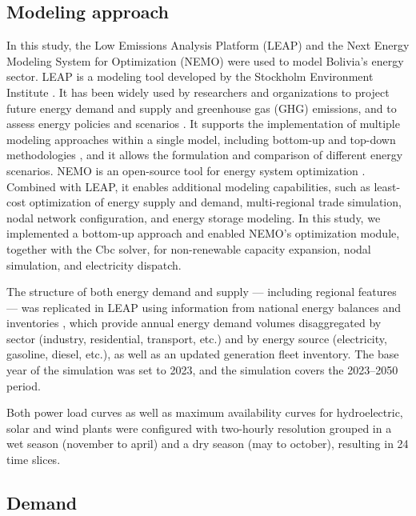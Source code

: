 \documentclass[a4paper,fleqn]{cas-dc}
\begin{document}
\subsection{Modeling approach}

In this study, the Low Emissions Analysis Platform (LEAP) and the Next Energy Modeling System for Optimization (NEMO) were used to model Bolivia's energy sector. LEAP is a modeling tool developed by the Stockholm Environment Institute \cite{Heaps2022LEAP}. It has been widely used by researchers and organizations to project future energy demand and supply and greenhouse gas (GHG) emissions, and to assess energy policies and scenarios \cite{emodi2017energy, shahid2021leap, handayani2023integrating}. It supports the implementation of multiple modeling approaches within a single model, including bottom-up \cite{fleiter2011barriers} and top-down methodologies \cite{rogan2014leaps}, and it allows the formulation and comparison of different energy scenarios. NEMO is an open-source tool for energy system optimization \cite{SEI2026NEMO}. Combined with LEAP, it enables additional modeling capabilities, such as least-cost optimization of energy supply and demand, multi-regional trade simulation, nodal network configuration, and energy storage modeling. In this study, we implemented a bottom-up approach and enabled NEMO's optimization module, together with the Cbc solver, for non-renewable capacity expansion, nodal simulation, and electricity dispatch.

The structure of both energy demand and supply — including regional features — was replicated in LEAP using information from national energy balances and inventories \cite{MHE2023BED, MHE2024BEN, AETN2026}, which provide annual energy demand volumes disaggregated by sector (industry, residential, transport, etc.) and by energy source (electricity, gasoline, diesel, etc.), as well as an updated generation fleet inventory. The base year of the simulation was set to 2023, and the simulation covers the 2023–2050 period.

Both power load curves as well as maximum availability curves for hydroelectric, solar and wind plants were configured with two-hourly resolution grouped in a wet season (november to april) and a dry season (may to october), resulting in 24 time slices.


\subsection{Demand}
\end{document}
